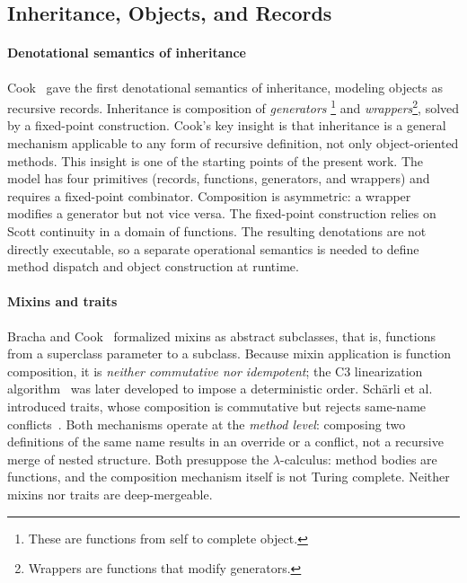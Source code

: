 \subsection{Inheritance, Objects, and Records}

\paragraph{Denotational semantics of inheritance}
Cook~\cite{cook1989-denotational-inheritance} gave the first denotational
semantics of inheritance, modeling objects as recursive records.
Inheritance is composition of \emph{generators}
\footnote{
  These are functions from self to complete object.
} and
\emph{wrappers}\footnote{
  Wrappers are functions that modify generators.
},
solved by a fixed-point construction.
Cook's key insight is that inheritance is a general mechanism
applicable to any form of recursive definition, not only
object-oriented methods. This insight is one of the starting points of the
present work.
The model has four primitives (records, functions, generators, and
wrappers) and requires a fixed-point combinator. Composition is
asymmetric: a wrapper modifies a generator but not vice versa.
The fixed-point construction relies on Scott continuity in a
domain of functions. The resulting denotations are not directly
executable, so a separate operational semantics is needed to
define method dispatch and object construction at runtime.

\paragraph{Mixins and traits}
Bracha and Cook~\cite{bracha1990-mixin-inheritance} formalized mixins as
abstract subclasses, that is, functions from a superclass parameter to a
subclass.
Because mixin application is function composition, it is
\emph{neither commutative nor idempotent}; the C3 linearization
algorithm~\cite{barrett1996-c3-linearization} was later developed to impose a
deterministic order.
Sch\"arli et al.~\cite{scharli2003-traits} introduced traits,
whose composition is commutative but rejects same-name
conflicts~\cite{ducasse2006-traits-fine-grained-reuse}.
Both mechanisms operate at the \emph{method level}: composing two
definitions of the same name results in an override or a conflict,
not a recursive merge of nested structure.
Both presuppose the $\lambda$-calculus: method bodies are functions,
and the composition mechanism itself is not Turing complete.
Neither mixins nor traits are deep-mergeable.

